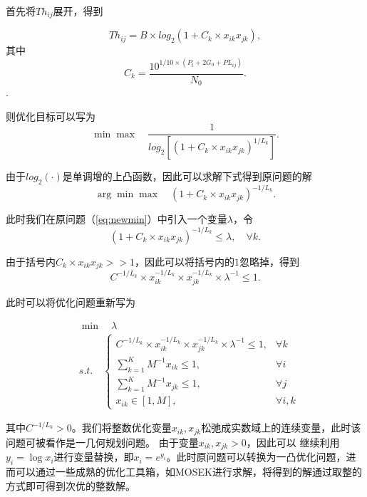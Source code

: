 首先将$Th_{ij}$展开，得到

\begin{equation}
	Th_{ij} = B \times log_2\left(1+C_k\times x_{ik}x_{jk}\right),
\end{equation}
其中
\begin{equation}
	C_k = \frac{10^{1/10\times (P_t+2G_0+PL_{ij})}}{N_0}.
\end{equation}.

则优化目标可以写为
\begin{equation}
	\min \max \quad \frac{1}{log_2[(1+C_k\times x_{ik}x_{jk})^{1/L_k}]}.
\end{equation}

由于$log_2( \cdot )$是单调增的上凸函数，因此可以求解下式得到原问题的解
\begin{equation}\label{eq:newmin}
	\arg  \min  \max \quad (1+C_k\times x_{ik}x_{jk})^{-1/L_k}.
\end{equation}


此时我们在原问题（\ref{eq:newmin}）中引入一个变量$\lambda$，令
\begin{equation}
	(1+C_k\times x_{ik}x_{jk})^{-1/L_k}\leq \lambda,\quad \forall k.
\end{equation}

由于括号内$C_k\times x_{ik}x_{jk}>>1$，因此可以将括号内的$1$忽略掉，得到
\begin{equation}
C^{-1/L_k}\times x_{ik}^{-1/L_k} \times x_{jk}^{-1/L_k} \times \lambda^{-1} \leq 1.
\end{equation}

此时可以将优化问题重新写为

\begin{equation}\label{eq:newone}
\begin{split}
&\min \quad\lambda \\
&s.t.\quad  \left\{\begin{array}{lr}
C^{-1/L_k}\times x_{ik}^{-1/L_k} \times x_{jk}^{-1/L_k} \times \lambda^{-1} \leq 1, &\forall k\\
\sum\limits_{k=1}^{K}M^{-1}x_{ik} \leq 1, \quad &\forall i\\
\sum\limits_{k=1}^{K}M^{-1}x_{jk} \leq 1, \quad &\forall j\\
x_{ik}\in[1,M], \quad  &\forall i,k \end{array}\right.
\end{split}
\end{equation}

其中$C^{-1/L_k}>0$。我们将整数优化变量$x_{ik},x_{jk}$松弛成实数域上的连续变量，此时该问题可被看作是一几何规划问题。
由于变量$x_{ik},x_{jk} > 0$，因此可以
继续利用$y_i =  \log x_i$进行变量替换，即$x_i = e^{y_i}$。此时原问题可以转换为一凸优化问题，进而可以通过一些成熟的优化工具箱，如MOSEK\cite{mosek}进行求解，将得到的解通过取整的方式即可得到次优的整数解。

